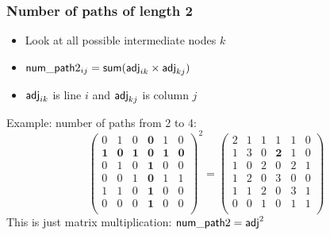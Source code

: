\documentclass[12pt]{beamer}
\begin{document}
\begin{frame}
\frametitle{Number of paths of length 2}
\begin{itemize}
\item Look at all possible intermediate nodes $k$
\item $\mathsf{num\_path}2_{ij} = \textsf{sum}(\mathsf{adj}_{ik} \times \mathsf{adj}_{kj})$
\item $\mathsf{adj}_{ik}$ is line $i$ and $\mathsf{adj}_{kj}$ is column $j$
\end{itemize}

Example: number of paths from 2 to 4:
\[
\left(
\begin{array}{cccccc}
0&1&0&\mathbf{0}&1&0\\
\mathbf{1}&\mathbf{0}&\mathbf{1}&\mathbf{0}&\mathbf{1}&\mathbf{0}\\
0&1&0&\mathbf{1}&0&0\\
0&0&1&\mathbf{0}&1&1\\
1&1&0&\mathbf{1}&0&0\\
0&0&0&\mathbf{1}&0&0\\
\end{array}
\right)^2
=
\left(
\begin{array}{cccccc}
2&1&1&1&1&0\\
1&3&0&\mathbf{2}&1&0\\
1&0&2&0&2&1\\
1&2&0&3&0&0\\
1&1&2&0&3&1\\
0&0&1&0&1&1\\
\end{array}
\right)
\]
This is just matrix multiplication: $\mathsf{num\_path}2 = \mathsf{adj}^2$
\end{frame}
\end{document}
